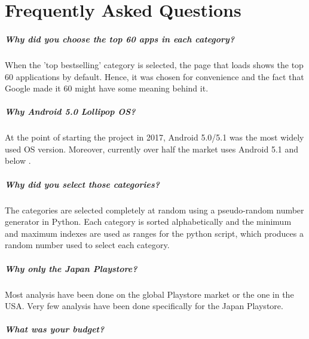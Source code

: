 
\chapter{Frequently Asked Questions} %

\label{FAQ} %

\paragraph{Why did you choose the top 60 apps in each category?}

When the 'top bestselling' category is selected, the page that loads shows the top 60 applications by default. Hence, it was chosen for convenience and the fact that Google made it 60 might have some meaning behind it.\\

\paragraph{Why Android 5.0 Lollipop OS?}

At the point of starting the project in 2017, Android 5.0/5.1 was the most widely used OS version. Moreover, currently over half the market uses Android 5.1 and below \cite{android2018version}.\\

\paragraph{Why did you select those categories?}

The categories are selected completely at random using a pseudo-random number generator in Python. Each category is sorted alphabetically and the minimum and maximum indexes are used as ranges for the python script, which produces a random number used to select each category.

\paragraph{Why only the Japan Playstore?}

Most analysis have been done on the global Playstore market or the one in the USA. Very few analysis have been done specifically for the Japan Playstore.

\paragraph{What was your budget?}

